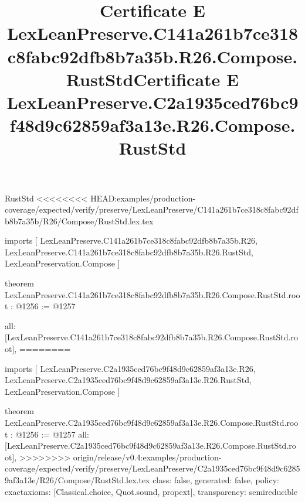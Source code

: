 \begin{lexlean}{RustStd}
<<<<<<<< HEAD:examples/production-coverage/expected/verify/preserve/LexLeanPreserve/C141a261b7ce318c8fabc92dfb8b7a35b/R26/Compose/RustStd.lex.tex
\title{Certificate E LexLeanPreserve.C141a261b7ce318c8fabc92dfb8b7a35b.R26.Compose.RustStd}
\begin{coremodule}
imports [
  LexLeanPreserve.C141a261b7ce318c8fabc92dfb8b7a35b.R26,
  LexLeanPreserve.C141a261b7ce318c8fabc92dfb8b7a35b.R26.RustStd,
  LexLeanPreservation.Compose
]

theorem LexLeanPreserve.C141a261b7ce318c8fabc92dfb8b7a35b.R26.Compose.RustStd.root : @1256 := @1257 {
  all: [LexLeanPreserve.C141a261b7ce318c8fabc92dfb8b7a35b.R26.Compose.RustStd.root],
========
\title{Certificate E LexLeanPreserve.C2a1935ced76bc9f48d9c62859af3a13e.R26.Compose.RustStd}
\begin{coremodule}
imports [
  LexLeanPreserve.C2a1935ced76bc9f48d9c62859af3a13e.R26,
  LexLeanPreserve.C2a1935ced76bc9f48d9c62859af3a13e.R26.RustStd,
  LexLeanPreservation.Compose
]

theorem LexLeanPreserve.C2a1935ced76bc9f48d9c62859af3a13e.R26.Compose.RustStd.root : @1256 := @1257 {
  all: [LexLeanPreserve.C2a1935ced76bc9f48d9c62859af3a13e.R26.Compose.RustStd.root],
>>>>>>>> origin/release/v0.4:examples/production-coverage/expected/verify/preserve/LexLeanPreserve/C2a1935ced76bc9f48d9c62859af3a13e/R26/Compose/RustStd.lex.tex
  class: false,
  generated: false,
  policy: exact{axioms: [Classical.choice, Quot.sound, propext]},
  transparency: semireducible
}


\end{coremodule}}
\end{coremodule}
\end{lexlean}

